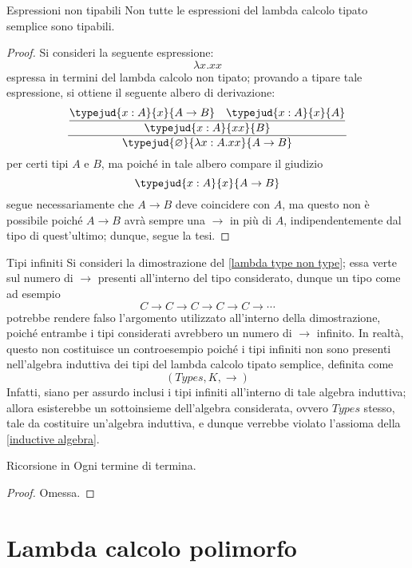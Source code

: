 \documentclass[a4paper, 12pt]{report}
\begin{document}
    \begin{framedlem}[label={lambda type non type}]{Espressioni non tipabili}
        Non tutte le espressioni del lambda calcolo tipato semplice sono tipabili.
    \end{framedlem}

    \begin{proof}
        Si consideri la seguente espressione: $$\lambda x. xx$$ espressa in termini del lambda calcolo non tipato; provando a tipare tale espressione, si ottiene il seguente albero di derivazione: $$\dfrac{\dfrac{\typejud{x:A}{x}{A \to B} \quad \typejud{x:A}{x}{A}}{\typejud{x:A}{xx}{B}}}{\typejud{\varnothing}{\lambda x: A .xx}{A \to B}}$$ per certi tipi $A$ e $B$, ma poiché in tale albero compare il giudizio $$\typejud{x:A}{x}{A \to B}$$ segue necessariamente che $A \to B$ deve coincidere con $A$, ma questo non è possibile poiché $A \to B$ avrà sempre una $\to$ in più di $A$, indipendentemente dal tipo di quest'ultimo; dunque, segue la tesi.
    \end{proof}

    \begin{framedobs}{Tipi infiniti}
        Si consideri la dimostrazione del \cref{lambda type non type}; essa verte sul numero di $\to$ presenti all'interno del tipo considerato, dunque un tipo  come ad esempio $$C \to C \to C \to C \to C \to \cdots$$ potrebbe rendere falso l'argomento utilizzato all'interno della dimostrazione, poiché entrambe i tipi considerati avrebbero un numero di $\to$ infinito. In realtà, questo non costituisce un controesempio poiché i tipi infiniti non sono presenti nell'algebra induttiva dei tipi del lambda calcolo tipato semplice, definita come $$(Types, K, \to)$$ Infatti, siano per assurdo inclusi i tipi infiniti all'interno di tale algebra induttiva; allora esisterebbe un sottoinsieme dell'algebra considerata, ovvero $Types$ stesso, tale da costituire un'algebra induttiva, e dunque verrebbe violato l'assioma  della \cref{inductive algebra}.
    \end{framedobs}

    \begin{framedprop}{Ricorsione in }
        Ogni termine di  termina.
    \end{framedprop}

    \begin{proof}
        Omessa.
    \end{proof}

    \section{Lambda calcolo polimorfo}
    
\end{document}
